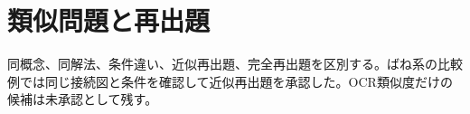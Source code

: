 \chapter{類似問題と再出題}
同概念、同解法、条件違い、近似再出題、完全再出題を区別する。ばね系の比較例では同じ接続図と条件を確認して近似再出題を承認した。OCR類似度だけの候補は未承認として残す。
